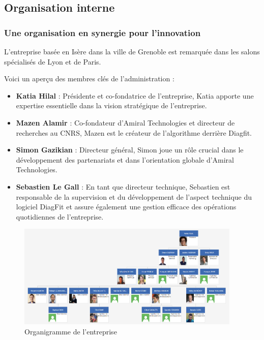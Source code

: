 \subsection{Organisation interne}
\subsubsection{Une organisation en synergie pour l'innovation}
L'entreprise basée en Isère dans la ville de Grenoble est remarquée dans les salons spécialisés de Lyon et de Paris.

Voici un aperçu des membres clés de l'administration :
\begin{itemize}
    \item \textbf{Katia Hilal} : Présidente et co-fondatrice de l'entreprise, Katia apporte une expertise essentielle dans la vision stratégique de l'entreprise.
    \item \textbf{Mazen Alamir} : Co-fondateur d'Amiral Technologies et directeur de recherches au CNRS, Mazen est le créateur de l'algorithme derrière Diagfit.
    \item \textbf{Simon Gazikian} : Directeur général, Simon joue un rôle crucial dans le développement des partenariats et dans l'orientation globale d'Amiral Technologies.
    \item \textbf{Sebastien Le Gall} : En tant que directeur technique, Sebastien est responsable de la supervision et du développement de l'aspect technique du logiciel DiagFit et assure également une gestion efficace des opérations quotidiennes de l'entreprise.
\end{itemize}

\begin{figure}[ht!]
    \centering
    \includegraphics[width=0.95\textwidth]{paper/figures/orga.png}
    \caption{Organigramme de l'entreprise}
    \label{fig:organigramme}
\end{figure}

\newpage

